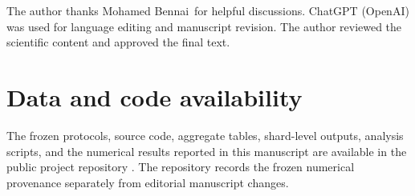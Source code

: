 \documentclass[aps,pra,reprint,superscriptaddress,nofootinbib,longbibliography]{revtex4-2}
\begin{document}
\begin{acknowledgments}
The author thanks Mohamed Bennai\, for helpful discussions. ChatGPT (OpenAI) was used for language editing and manuscript revision. The author reviewed the scientific content and approved the final text.
\end{acknowledgments}

\section*{Data and code availability}
The frozen protocols, source code, aggregate tables, shard-level outputs, analysis scripts, and the numerical results reported in this manuscript are available in the public project repository \cite{AitHaddou2026MeasurementAccessible}. The repository records the frozen numerical provenance separately from editorial manuscript changes.

\clearpage
\end{document}
